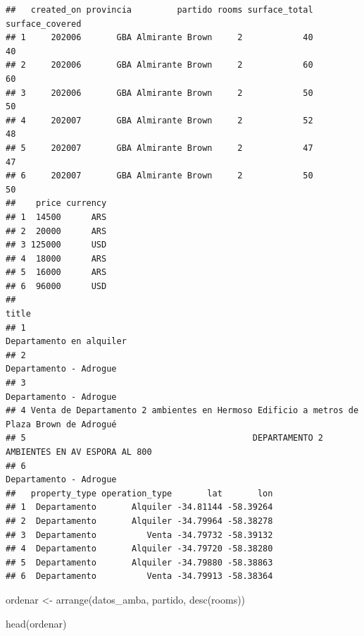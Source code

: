 \documentclass[
  spanish,
]{book}
\newenvironment{Shaded}{\begin{snugshade}}{\end{snugshade}}
\newcommand{\FunctionTok}[1]{\textcolor[rgb]{0.00,0.00,0.00}{#1}}
\newcommand{\NormalTok}[1]{#1}
\newcommand{\OtherTok}[1]{\textcolor[rgb]{0.56,0.35,0.01}{#1}}
\begin{document}
\begin{verbatim}
##   created_on provincia         partido rooms surface_total surface_covered
## 1     202006       GBA Almirante Brown     2            40              40
## 2     202006       GBA Almirante Brown     2            60              60
## 3     202006       GBA Almirante Brown     2            50              50
## 4     202007       GBA Almirante Brown     2            52              48
## 5     202007       GBA Almirante Brown     2            47              47
## 6     202007       GBA Almirante Brown     2            50              50
##    price currency
## 1  14500      ARS
## 2  20000      ARS
## 3 125000      USD
## 4  18000      ARS
## 5  16000      ARS
## 6  96000      USD
##                                                                                      title
## 1                                                                 Departamento en alquiler
## 2                                                                   Departamento - Adrogue
## 3                                                                   Departamento - Adrogue
## 4 Venta de Departamento 2 ambientes en Hermoso Edificio a metros de Plaza Brown de Adrogué
## 5                                             DEPARTAMENTO 2 AMBIENTES EN AV ESPORA AL 800
## 6                                                                   Departamento - Adrogue
##   property_type operation_type       lat       lon
## 1  Departamento       Alquiler -34.81144 -58.39264
## 2  Departamento       Alquiler -34.79964 -58.38278
## 3  Departamento          Venta -34.79732 -58.39132
## 4  Departamento       Alquiler -34.79720 -58.38280
## 5  Departamento       Alquiler -34.79880 -58.38863
## 6  Departamento          Venta -34.79913 -58.38364
\end{verbatim}

\begin{Shaded}
\begin{Highlighting}[]
\NormalTok{ordenar }\OtherTok{\textless{}{-}} \FunctionTok{arrange}\NormalTok{(datos\_amba, partido, }\FunctionTok{desc}\NormalTok{(rooms))}

\FunctionTok{head}\NormalTok{(ordenar)}
\end{Highlighting}
\end{Shaded}
\end{document}
